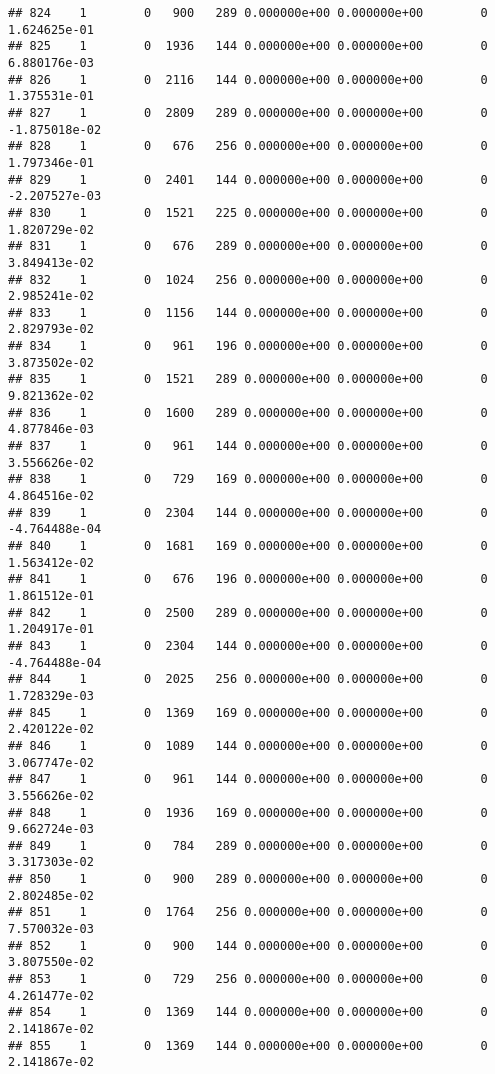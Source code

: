 \documentclass[
]{article}
\begin{document}
\begin{enumerate}
\begin{verbatim}
## 824    1        0   900   289 0.000000e+00 0.000000e+00        0  1.624625e-01
## 825    1        0  1936   144 0.000000e+00 0.000000e+00        0  6.880176e-03
## 826    1        0  2116   144 0.000000e+00 0.000000e+00        0  1.375531e-01
## 827    1        0  2809   289 0.000000e+00 0.000000e+00        0 -1.875018e-02
## 828    1        0   676   256 0.000000e+00 0.000000e+00        0  1.797346e-01
## 829    1        0  2401   144 0.000000e+00 0.000000e+00        0 -2.207527e-03
## 830    1        0  1521   225 0.000000e+00 0.000000e+00        0  1.820729e-02
## 831    1        0   676   289 0.000000e+00 0.000000e+00        0  3.849413e-02
## 832    1        0  1024   256 0.000000e+00 0.000000e+00        0  2.985241e-02
## 833    1        0  1156   144 0.000000e+00 0.000000e+00        0  2.829793e-02
## 834    1        0   961   196 0.000000e+00 0.000000e+00        0  3.873502e-02
## 835    1        0  1521   289 0.000000e+00 0.000000e+00        0  9.821362e-02
## 836    1        0  1600   289 0.000000e+00 0.000000e+00        0  4.877846e-03
## 837    1        0   961   144 0.000000e+00 0.000000e+00        0  3.556626e-02
## 838    1        0   729   169 0.000000e+00 0.000000e+00        0  4.864516e-02
## 839    1        0  2304   144 0.000000e+00 0.000000e+00        0 -4.764488e-04
## 840    1        0  1681   169 0.000000e+00 0.000000e+00        0  1.563412e-02
## 841    1        0   676   196 0.000000e+00 0.000000e+00        0  1.861512e-01
## 842    1        0  2500   289 0.000000e+00 0.000000e+00        0  1.204917e-01
## 843    1        0  2304   144 0.000000e+00 0.000000e+00        0 -4.764488e-04
## 844    1        0  2025   256 0.000000e+00 0.000000e+00        0  1.728329e-03
## 845    1        0  1369   169 0.000000e+00 0.000000e+00        0  2.420122e-02
## 846    1        0  1089   144 0.000000e+00 0.000000e+00        0  3.067747e-02
## 847    1        0   961   144 0.000000e+00 0.000000e+00        0  3.556626e-02
## 848    1        0  1936   169 0.000000e+00 0.000000e+00        0  9.662724e-03
## 849    1        0   784   289 0.000000e+00 0.000000e+00        0  3.317303e-02
## 850    1        0   900   289 0.000000e+00 0.000000e+00        0  2.802485e-02
## 851    1        0  1764   256 0.000000e+00 0.000000e+00        0  7.570032e-03
## 852    1        0   900   144 0.000000e+00 0.000000e+00        0  3.807550e-02
## 853    1        0   729   256 0.000000e+00 0.000000e+00        0  4.261477e-02
## 854    1        0  1369   144 0.000000e+00 0.000000e+00        0  2.141867e-02
## 855    1        0  1369   144 0.000000e+00 0.000000e+00        0  2.141867e-02

\end{verbatim}
\end{enumerate}
\end{document}
